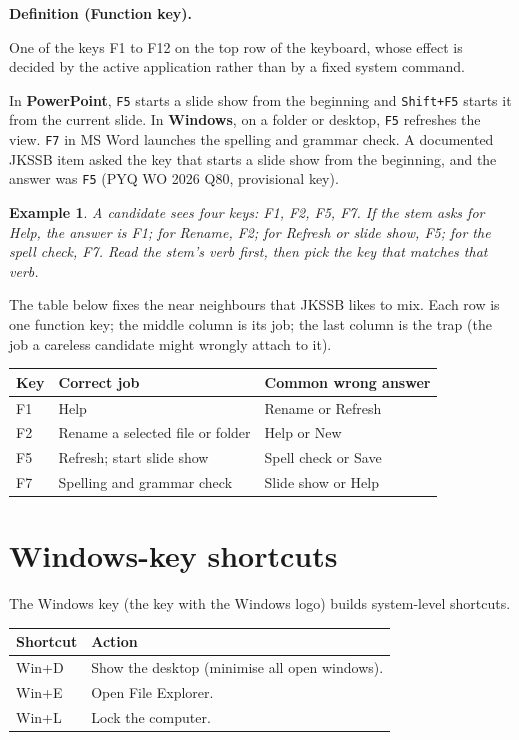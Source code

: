 \documentclass[11pt]{article}
\newtheorem{example}{Example}[section]
\newenvironment{definitionbox}[1]{%
  \par\noindent\textbf{Definition (#1).}\ \itshape
}{\par\vspace{0.3em}}
\begin{document}
\begin{definitionbox}{Function key}
One of the keys F1 to F12 on the top row of the keyboard, whose effect is
decided by the active application rather than by a fixed system command.
\end{definitionbox}

In \textbf{PowerPoint}, \texttt{F5} starts a slide show from the beginning and
\texttt{Shift+F5} starts it from the current slide. In \textbf{Windows}, on a
folder or desktop, \texttt{F5} refreshes the view. \texttt{F7} in MS Word
launches the spelling and grammar check. A documented JKSSB item asked the key
that starts a slide show from the beginning, and the answer was \texttt{F5}
(PYQ WO 2026 Q80, provisional key).

\begin{example}
A candidate sees four keys: F1, F2, F5, F7. If the stem asks for Help, the
answer is F1; for Rename, F2; for Refresh or slide show, F5; for the spell
check, F7. Read the stem's verb first, then pick the key that matches that verb.
\end{example}

The table below fixes the near neighbours that JKSSB likes to mix. Each row is
one function key; the middle column is its job; the last column is the trap
(the job a careless candidate might wrongly attach to it).

\begin{center}
\begin{tabular}{p{}p{}p{}}
\toprule
\textbf{Key} & \textbf{Correct job} & \textbf{Common wrong answer} \\
\midrule
F1 & Help & Rename or Refresh \\
F2 & Rename a selected file or folder & Help or New \\
F5 & Refresh; start slide show & Spell check or Save \\
F7 & Spelling and grammar check & Slide show or Help \\
\bottomrule
\end{tabular}
\end{center}

\section{Windows-key shortcuts}
The Windows key (the key with the Windows logo) builds system-level shortcuts.

\begin{center}
\begin{tabular}{p{}p{}}
\toprule
\textbf{Shortcut} & \textbf{Action} \\
\midrule
Win+D & Show the desktop (minimise all open windows). \\
Win+E & Open File Explorer. \\
Win+L & Lock the computer. \\
\bottomrule
\end{tabular}
\end{center}
\end{document}

